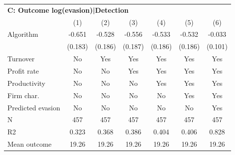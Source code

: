 \begin{tabular}{lcccccc}
\midrule \multicolumn{7}{l}{\textbf{C: Outcome log(evasion)|Detection}} \\ \multicolumn{1}{l}{} & (1) & (2) & (3) & (4) & (5) & (6) \\ \midrule
Algorithm   &      -0.651\sym{***}&      -0.528\sym{***}&      -0.556\sym{***}&      -0.533\sym{***}&      -0.532\sym{***}&      -0.033         \\
            &     (0.183)         &     (0.186)         &     (0.187)         &     (0.186)         &     (0.186)         &     (0.101)         \\
\midrule
Turnover    &          No         &         Yes         &         Yes         &         Yes         &         Yes         &         Yes         \\
Profit rate &          No         &          No         &         Yes         &         Yes         &         Yes         &         Yes         \\
Productivity&          No         &          No         &          No         &         Yes         &         Yes         &         Yes         \\
Firm char.  &          No         &          No         &          No         &          No         &         Yes         &         Yes         \\
Predicted evasion&          No         &          No         &          No         &          No         &          No         &         Yes         \\
N           &         457         &         457         &         457         &         457         &         457         &         457         \\
R2          &       0.323         &       0.368         &       0.386         &       0.404         &       0.406         &       0.828         \\
Mean outcome&       19.26         &       19.26         &       19.26         &       19.26         &       19.26         &       19.26         \\
\bottomrule \end{tabular}
